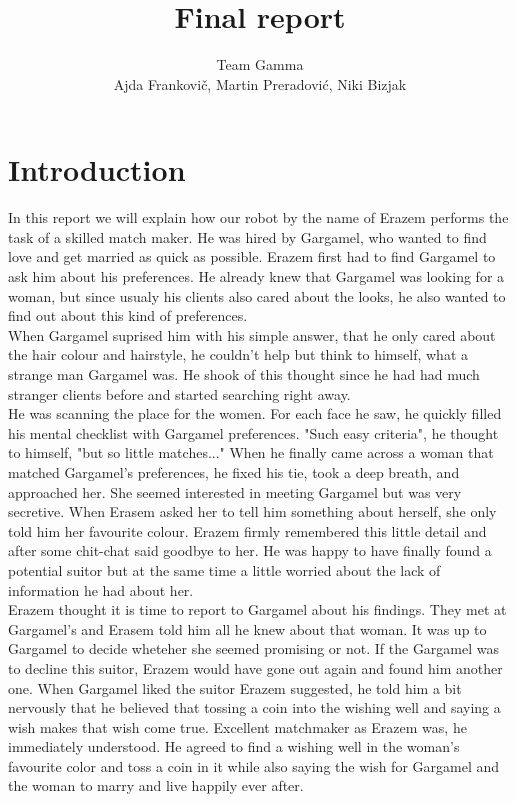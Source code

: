 \documentclass[12pt,a4paper]{article}
\author{Team Gamma \\ {\small Ajda Frankovič, Martin Preradović, Niki Bizjak}}
\title{Final report}
\date{}
\begin{document}
	
	\maketitle

	\tableofcontents
	
	\section{Introduction}
	In this report we will explain how our robot by the name of Erazem performs the task of a skilled match maker. He was hired by Gargamel, who wanted to find love and get married as quick as possible. Erazem first had to find Gargamel to ask him about his preferences. He already knew that Gargamel was looking for a woman, but since usualy his clients also cared about the looks, he also wanted to find out about this kind of preferences. \\
	
	When Gargamel suprised him with his simple answer, that he only cared about the hair colour and hairstyle, he couldn't help but think to himself, what a strange man Gargamel was. He shook of this thought since he had had much stranger clients before and started searching right away. \\

	He was scanning the place for the women. For each face he saw, he quickly filled his mental checklist with Gargamel preferences. "Such easy criteria", he thought to himself, "but so little matches..." When he finally came across a woman that matched Gargamel's preferences, he fixed his tie, took a deep breath, and approached her. She seemed interested in meeting Gargamel but was very secretive. When Erasem asked her to tell him something about herself, she only told him her favourite colour. Erazem firmly remembered this little detail and after some chit-chat said goodbye to her. He was happy to have finally found a potential suitor but at the same time a little worried about the lack of information he had about her. \\
	
	Erazem thought it is time to report to Gargamel about his findings. They met at Gargamel's and Erasem told him all he knew about that woman. It was up to Gargamel to decide wheteher she seemed promising or not. If the Gargamel was to decline this suitor, Erazem would have gone out again and found him another one. When Gargamel liked the suitor Erazem suggested, he told him a bit nervously that he believed that tossing a coin into the wishing well and saying a wish makes that wish come true. Excellent matchmaker as Erazem was, he immediately understood. He agreed to find a wishing well in the woman's favourite color and toss a coin in it while also saying the wish for Gargamel and the woman to marry and live happily ever after. \\
\end{document}
